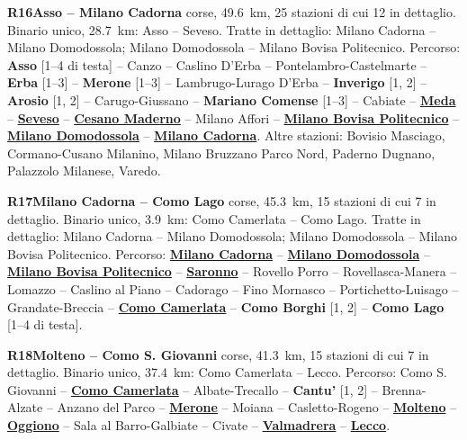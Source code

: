 \medskip\noindent\hypertarget{lin:R16}{\textbf{R16\enspace Asso -- Milano Cadorna}} corse, \SI{49,6}{\km}, 25 stazioni di cui 12 in dettaglio. Binario unico, \SI{28,7}{\km}: Asso -- Seveso. Tratte in dettaglio: Milano Cadorna -- Milano Domodossola; Milano Domodossola -- Milano Bovisa Politecnico. Percorso: \hypertarget{sta:S01101}{\textbf{Asso}} [1--4 di testa] -- Canzo -- Caslino D'Erba -- Pontelambro-Castelmarte -- \hypertarget{sta:S01096}{\textbf{Erba}} [1--3] -- \hypertarget{sta:S01454}{\textbf{Merone}} [1--3] -- Lambrugo-Lurago D'Erba -- \hypertarget{sta:S01093}{\textbf{Inverigo}} [1, 2] -- \hypertarget{sta:S01092}{\textbf{Arosio}} [1, 2] -- Carugo-Giussano -- \hypertarget{sta:S01089}{\textbf{Mariano Comense}} [1--3] -- Cabiate -- \hyperlink{sta:S01087}{\textbf{Meda}} -- \hyperlink{sta:S01925}{\textbf{Seveso}} -- \hyperlink{sta:S01086}{\textbf{Cesano Maderno}} -- Milano Affori -- \hyperlink{sta:S01642}{\textbf{Milano Bovisa Politecnico}} -- \hyperlink{sta:S01067}{\textbf{Milano Domodossola}} -- \hyperlink{sta:S01066}{\textbf{Milano Cadorna}}. Altre stazioni: Bovisio Masciago, Cormano-Cusano Milanino, Milano Bruzzano Parco Nord, Paderno Dugnano, Palazzolo Milanese, Varedo.

\medskip\noindent\hypertarget{lin:R17}{\textbf{R17\enspace Milano Cadorna -- Como Lago}} corse, \SI{45,3}{\km}, 15 stazioni di cui 7 in dettaglio. Binario unico, \SI{3,9}{\km}: Como Camerlata -- Como Lago. Tratte in dettaglio: Milano Cadorna -- Milano Domodossola; Milano Domodossola -- Milano Bovisa Politecnico. Percorso: \hyperlink{sta:S01066}{\textbf{Milano Cadorna}} -- \hyperlink{sta:S01067}{\textbf{Milano Domodossola}} -- \hyperlink{sta:S01642}{\textbf{Milano Bovisa Politecnico}} -- \hyperlink{sta:S01933}{\textbf{Saronno}} -- Rovello Porro -- Rovellasca-Manera -- Lomazzo -- Caslino al Piano -- Cadorago -- Fino Mornasco -- Portichetto-Luisago -- Grandate-Breccia -- \hyperlink{sta:S09998}{\textbf{Como Camerlata}} -- \hypertarget{sta:S01764}{\textbf{Como Borghi}} [1, 2] -- \hypertarget{sta:S01765}{\textbf{Como Lago}} [1--4 di testa].

\medskip\noindent\hypertarget{lin:R18}{\textbf{R18\enspace Molteno -- Como S. Giovanni}} corse, \SI{41,3}{\km}, 15 stazioni di cui 7 in dettaglio. Binario unico, \SI{37,4}{\km}: Como Camerlata -- Lecco. Percorso: Como S. Giovanni -- \hyperlink{sta:S09998}{\textbf{Como Camerlata}} -- Albate-Trecallo -- \hypertarget{sta:S01451}{\textbf{Cantu'}} [1, 2] -- Brenna-Alzate -- Anzano del Parco -- \hyperlink{sta:S01454}{\textbf{Merone}} -- Moiana -- Casletto-Rogeno -- \hyperlink{sta:S01458}{\textbf{Molteno}} -- \hyperlink{sta:S01460}{\textbf{Oggiono}} -- Sala al Barro-Galbiate -- Civate -- \hyperlink{sta:S01463}{\textbf{Valmadrera}} -- \hyperlink{sta:S01520}{\textbf{Lecco}}.

